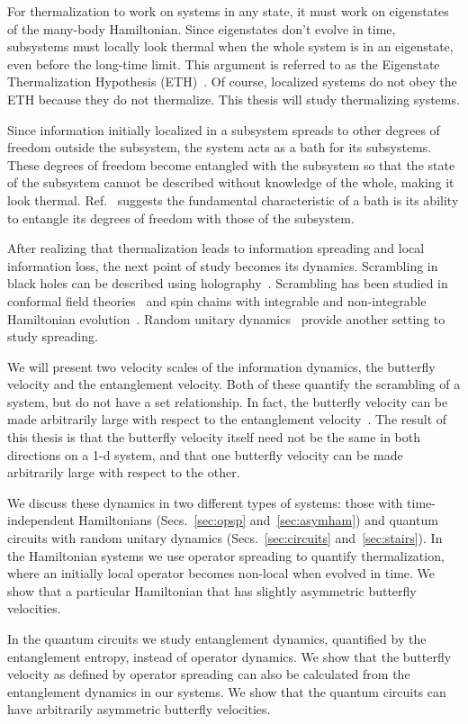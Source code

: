 For thermalization to work on systems in any state, it must work on eigenstates of the many-body Hamiltonian. Since eigenstates don't evolve in time, subsystems must locally look thermal when the whole system is in an eigenstate, even before the long-time limit. This argument is referred to as the Eigenstate Thermalization Hypothesis (ETH)~\cite{Deutsch91, Srednicki1994, Rigol2008, Nandkishore2015}. Of course, localized systems do not obey the ETH because they do not thermalize. This thesis will study thermalizing systems.

Since information initially localized in a subsystem spreads to other degrees of freedom outside the subsystem, the system acts as a bath for its subsystems. These degrees of freedom become entangled with the subsystem so that the state of the subsystem cannot be described without knowledge of the whole, making it look thermal. Ref.~\cite{Nandkishore2015} suggests the fundamental characteristic of a bath is its ability to entangle its degrees of freedom with those of the subsystem.

After realizing that thermalization leads to information spreading and local information loss, the next point of study becomes its dynamics. Scrambling in black holes can be described using holography~\cite{Sekino2008, Shenker2014}. Scrambling has been studied in conformal field theories~\cite{Calabrese2005} and spin chains with integrable and non-integrable Hamiltonian evolution~\cite{Fagotti2008, Luchli2008, Kim2013, Baradson2012}. Random unitary dynamics~\cite{Keyserlingk, Nahum2017,Nahum2017q,Nahum2018,Jonay18} provide another setting to study spreading.

We will present two velocity scales of the information dynamics, the butterfly velocity and the entanglement velocity. Both of these quantify the scrambling of a system, but do not have a set relationship. In fact, the butterfly velocity can be made arbitrarily large with respect to the entanglement velocity~\cite{Nahum2018}. The result of this thesis is that the butterfly velocity itself need not be the same in both directions on a 1-d system, and that one butterfly velocity can be made arbitrarily large with respect to the other.

We discuss these dynamics in two different types of systems: those with time-independent Hamiltonians (Secs.~\ref{sec:opsp} and~\ref{sec:asymham}) and quantum circuits with random unitary dynamics (Secs.~\ref{sec:circuits} and~\ref{sec:stairs}). In the Hamiltonian systems we use operator spreading to quantify thermalization, where an initially local operator becomes non-local when evolved in time. We show that a particular Hamiltonian that has slightly asymmetric butterfly velocities.

In the quantum circuits we study entanglement dynamics, quantified by the entanglement entropy, instead of operator dynamics. 
We show that the butterfly velocity as defined by operator spreading can also be calculated from the entanglement dynamics in our systems. We show that the quantum circuits can have arbitrarily asymmetric butterfly velocities. 
